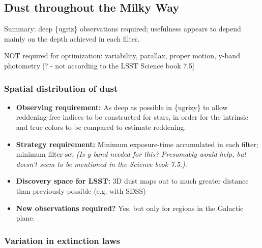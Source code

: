 \subsection{Dust throughout the Milky Way}

Summary: deep \{ugriz\} observations required; usefulness appears to depend mainly on the depth achieved in each filter.

NOT required for optimization: variability, parallax, proper motion,
y-band photometry [? - not according to the LSST Science book 7.5]

\subsubsection{Spatial distribution of dust}

\begin{itemize}
\item {\bf Observing requirement:} As deep as possible in \{ugrizy\} to allow reddening-free indices to be constructed for stars, in order for the intrinsic and true colors to be compared to estimate reddening.
\vspace{-2mm}

\item {\bf Strategy requirement:} Minimum exposure-time accumulated in each filter; minimum filter-set {\it (Is y-band needed for this? Presumably would help, but doesn't seem to be mentioned in the Science book 7.5.)}.
\vspace{-2mm}

\item {\bf Discovery space for LSST:} 3D dust maps out to much greater distance than previously possible (e.g. with SDSS)
\vspace{-2mm}

\item {\bf New observations required?} Yes, but only for regions in the Galactic plane.
\vspace{-2mm}
\end{itemize}


\subsubsection{Variation in extinction laws}

